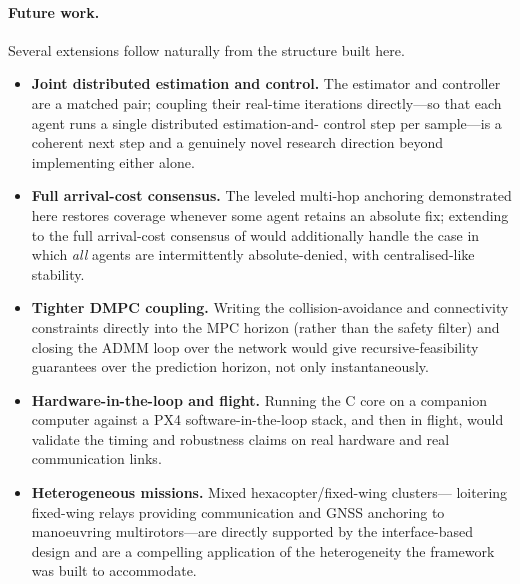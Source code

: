 \paragraph{Future work.} Several extensions follow naturally from the structure
built here.
\begin{itemize}[nosep,leftmargin=1.4em]
  \item \textbf{Joint distributed estimation and control.} The estimator and
        controller are a matched pair; coupling their real-time iterations
        directly---so that each agent runs a single distributed estimation-and-%
        control step per sample---is a coherent next step and a genuinely novel
        research direction beyond implementing either alone.
  \item \textbf{Full arrival-cost consensus.} The leveled multi-hop anchoring
        demonstrated here restores coverage whenever some agent retains an
        absolute fix; extending to the full arrival-cost consensus of
        \cite{battistelli2019distributed} would additionally handle the case in
        which \emph{all} agents are intermittently absolute-denied, with
        centralised-like stability.
  \item \textbf{Tighter DMPC coupling.} Writing the collision-avoidance and
        connectivity constraints directly into the MPC horizon (rather than the
        safety filter) and closing the ADMM loop over the network would give
        recursive-feasibility guarantees over the prediction horizon, not only
        instantaneously.
  \item \textbf{Hardware-in-the-loop and flight.} Running the C core on a
        companion computer against a PX4 software-in-the-loop stack, and then in
        flight, would validate the timing and robustness claims on real hardware
        and real communication links.
  \item \textbf{Heterogeneous missions.} Mixed hexacopter/fixed-wing clusters---%
        loitering fixed-wing relays providing communication and GNSS anchoring to
        manoeuvring multirotors---are directly supported by the interface-based
        design and are a compelling application of the heterogeneity the
        framework was built to accommodate.
\end{itemize}
